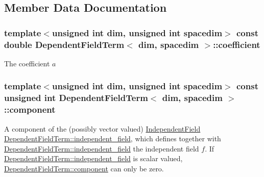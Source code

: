 \subsection{Member Data Documentation}
\subsubsection[{\texorpdfstring{coefficient}{coefficient}}]{\setlength{\rightskip}{0pt plus 5cm}template$<$unsigned int dim, unsigned int spacedim$>$ const double {\bf Dependent\+Field\+Term}$<$ dim, spacedim $>$\+::coefficient}\hypertarget{class_dependent_field_term_a59a9183a32ac55fb728f3797b68a9f8f}{}\label{class_dependent_field_term_a59a9183a32ac55fb728f3797b68a9f8f}
The coefficient $a$ 
\subsubsection[{\texorpdfstring{component}{component}}]{\setlength{\rightskip}{0pt plus 5cm}template$<$unsigned int dim, unsigned int spacedim$>$ const unsigned int {\bf Dependent\+Field\+Term}$<$ dim, spacedim $>$\+::component}\hypertarget{class_dependent_field_term_ac6f3ac40d4ee2c8b9f9bbdfa34079b74}{}\label{class_dependent_field_term_ac6f3ac40d4ee2c8b9f9bbdfa34079b74}
A component of the (possibly vector valued) \hyperlink{class_independent_field}{Independent\+Field} \hyperlink{class_dependent_field_term_a89d1c3fea36e6fe105232097a321e095}{Dependent\+Field\+Term\+::independent\+\_\+field}, which defines together with \hyperlink{class_dependent_field_term_a89d1c3fea36e6fe105232097a321e095}{Dependent\+Field\+Term\+::independent\+\_\+field} the independent field $f$. If \hyperlink{class_dependent_field_term_a89d1c3fea36e6fe105232097a321e095}{Dependent\+Field\+Term\+::independent\+\_\+field} is scalar valued, \hyperlink{class_dependent_field_term_ac6f3ac40d4ee2c8b9f9bbdfa34079b74}{Dependent\+Field\+Term\+::component} can only be zero. 
